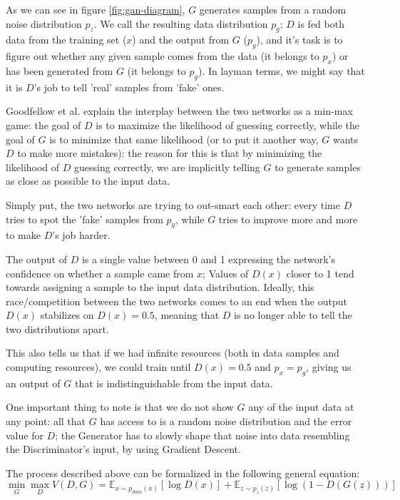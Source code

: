 As we can see in figure \ref{fig:gan-diagram}, $G$ generates samples from a random noise distribution $p_z$. We call the resulting data distribution $p_g$; $D$ is fed both data from the training set ($x$) and the output from $G$ ($p_g$), and it's task is to figure out whether any given sample comes from the data (it belongs to $p_x$) or has been generated from $G$ (it belongs to $p_g$). In layman terms, we might say that it is $D$'s job to tell 'real' samples from 'fake' ones.

Goodfellow et al.\cite{Goodfellow2014} explain the interplay between the two networks as a min-max game: the goal of $D$ is to maximize the likelihood of guessing correctly, while the goal of $G$ is to minimize that same likelihood (or to put it another way, $G$ wants $D$ to make more mistakes): the reason for this is that by minimizing the likelihood of $D$ guessing correctly, we are implicitly telling $G$ to generate samples as close as possible to the input data.

Simply put, the two networks are trying to out-smart each other: every time $D$ tries to spot the 'fake' samples from $p_g$, while $G$ tries to improve more and more to make $D$'s job harder.

The output of $D$ is a single value between 0 and 1 expressing the network's confidence on whether a sample came from $x$; Values of $D(x)$ closer to 1 tend towards assigning a sample to the input data distribution.
Ideally, this race/competition between the two networks comes to an end when the output $D(x)$ stabilizes on $D(x)=0.5$, meaning that $D$ is no longer able to tell the two distributions apart.

This also tells us that if we had infinite resources (both in  data samples and computing resources), we could train until $D(x)=0.5$ and $p_x=p_g$, giving us an output of $G$ that is indistinguishable from the input data.

One important thing to note is that we do not show $G$ any of the input data at any point: all that $G$ has access to is a random noise distribution and the error value for $D$; the Generator has to slowly shape that noise into data resembling the Discriminator's input, by using Gradient Descent.  

The process described above can be formalized in the following general equation:
\begin{equation}
 \min\limits_{G} \max\limits_{D} V(D,G)=\mathbb{E}_{x\sim p_{data}(x)}[\log{D(x)}]+\mathbb{E}_{z\sim p_z(z)}[\log{(1-D(G(z)))}] 
\end{equation} 

